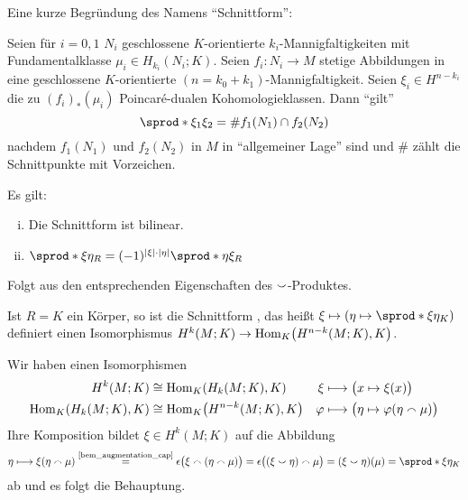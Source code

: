 \begin{bemerkung}[{name=[Begründung des Namens \enquote{Schnittform}]}]
	Eine kurze Begründung des Namens \enquote{Schnittform}:
	
	Seien für $i=0,1$ $N_i$ geschlossene $K$-orientierte $k_i$-Mannigfaltigkeiten mit Fundamentalklasse $\mu_i \in H_{k_i}(N_i;K)$.
	Seien $f_i \colon N_i \to M$ stetige Abbildungen in eine geschlossene $K$-orientierte $(n=k_0+k_1)$-Mannigfaltigkeit.
	Seien $\xi_i \in H^{n-{k_i}}$ die zu $(f_i)_*(\mu_i)$ Poincaré-dualen Kohomologieklassen. Dann \enquote{gilt}
	\[
		\sprod*{\xi_1}{\xi_2} = \# f_1(N_1) \cap f_2(N_2)
	\]
	nachdem $f_1(N_1)$ und $f_2(N_2)$ in $M$ in \enquote{allgemeiner Lage} sind und $\#$ zählt die Schnittpunkte mit Vorzeichen.
\end{bemerkung}

\begin{lemma}[{name=[Schnittform ist bilinear und graduiert kommutativ]}]
	Es gilt:
	\begin{enumerate}[(i),itemsep=2pt]
		\item Die Schnittform ist bilinear.
		\item $\sprod*{\xi}{\eta}_R = (-1)^{\abs*{\xi}\cdot \abs*{\eta}} \sprod*{\eta}{\xi}_R$
	\end{enumerate}
\end{lemma}
\begin{beweis}
	Folgt aus den entsprechenden Eigenschaften des $\smallsmile$-Produktes.
\end{beweis}

\begin{satz}[{name=[Für einen Körper sind Schnittformen regulär]}]
	Ist $R=K$ ein Körper, so ist die Schnittform , das heißt $\xi \mapsto \enbrace*{\eta \mapsto \sprod*{\xi}{\eta}_K}$ definiert einen Isomorphismus $H^k(M;K) \to \Hom_K \enbrace*{H^{n-k}(M;K),K}$.
\end{satz}
\begin{beweis}
	Wir haben einen Isomorphismen
	\begin{align}
		H^k(M;K) &\cong \Hom_K \enbrace*{H_k(M;K),K}  & \xi &\longmapsto  \enbrace[\big]{x \mapsto \xi(x)} \\
		\Hom_K \enbrace*{H_k(M;K),K} &\cong \Hom_K \enbrace*{H^{n-k}(M;K),K}   &  \varphi &\longmapsto  \enbrace[\big]{\eta \mapsto \varphi \enbrace*{\eta \capp \mu}}
	\end{align}
	Ihre Komposition bildet $\xi \in H^k(M;K)$ auf die Abbildung
	\[
		\eta \longmapsto \xi \enbrace*{\eta \capp \mu} \StackText{\ref{bem_augmentation_cap}}{=} \epsilon \enbrace[\big]{\xi \capp (\eta \capp \mu)} = \epsilon \enbrace[\big]{(\xi \cupp \eta) \capp \mu} = (\xi \cupp \eta)(\mu) = \sprod*{\xi}{\eta}_K
	\]
	ab und es folgt die Behauptung.
\end{beweis}

